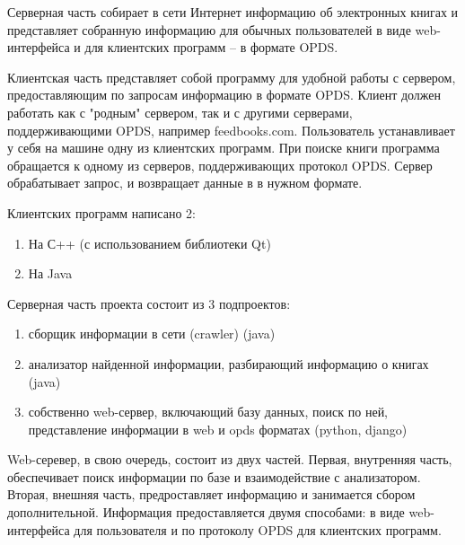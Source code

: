 Серверная часть собирает в сети Интернет информацию об электронных книгах и представляет собранную информацию для обычных пользователей в виде web-интерфейса и для клиентских программ -- в формате OPDS.

Клиентская часть представляет собой программу для удобной работы с сервером, предоставляющим по запросам информацию в формате OPDS. Клиент должен работать как с "родным" сервером, так и с другими серверами, поддерживающими OPDS, например feedbooks.com.
Пользователь устанавливает у себя на машине одну из клиентских программ. При поиске книги программа обращается к одному из серверов, поддерживающих протокол OPDS. Сервер обрабатывает запрос, и возвращает данные в в нужном формате. 

Клиентских программ написано 2:
\begin{enumerate}
	\item На С++ (с использованием библиотеки Qt)
	\item На Java
\end{enumerate}

Серверная часть проекта состоит из 3 подпроектов:
\begin{enumerate}
	\item сборщик информации в сети (crawler) (java)
	\item анализатор найденной информации, разбирающий информацию о книгах (java) 
	\item собственно web-сервер, включающий базу данных, поиск по ней, представление информации в web и opds форматах (python, django)
\end{enumerate}

Web-серевер, в свою очередь, состоит из двух частей. Первая, внутренняя часть, обеспечивает поиск информации по базе и взаимодействие с анализатором.
Вторая, внешняя часть, предроставляет информацию и занимается сбором дополнительной. Информация предоставляется двумя способами: в виде web-интерфейса для пользователя и по протоколу OPDS для клиентских программ.


		

